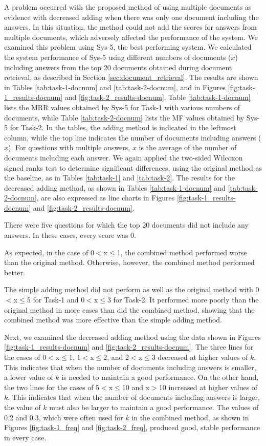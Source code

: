 A problem occurred with the proposed method of using multiple documents as evidence with decreased adding 
when there was only one document including the answers. 
In this situation, 
the method could not add the scores for answers from multiple documents, 
which adversely affected
the performance of the system. 
We examined this problem using Sys-5, the best performing system. 
We calculated the system performance of Sys-5 
using different numbers of documents ($x$) including answers from 
the top 20 documents obtained during document retrieval, as described in Section \ref{sec:document_retrieval}. 
The results are shown in Tables \ref{tab:task-1-docnum} and \ref{tab:task-2-docnum}, and 
in Figures \ref{fig:task-1_results-docnum} and \ref{fig:task-2_results-docnum}. 
Table \ref{tab:task-1-docnum} lists the MRR values obtained by Sys-5 for Task-1 with various numbers of documents, while
Table \ref{tab:task-2-docnum} lists the MF values obtained by Sys-5 for Task-2. 
In the tables, the adding method is indicated in the leftmost column, while
the top line indicates the number of documents including answers ($x$). 
For questions with multiple answers, 
$x$ is the average of the number of documents including each answer.
We again applied the two-sided Wilcoxon signed ranks test to determine significant differences, 
using the original method as the baseline, as in Tables \ref{tab:task-1} and \ref{tab:task-2}. 
The results for the decreased adding method, as shown in Tables \ref{tab:task-1-docnum} and \ref{tab:task-2-docnum}, are also expressed 
as line charts in Figures \ref{fig:task-1_results-docnum} and \ref{fig:task-2_results-docnum}. 

There were five questions for which
the top 20 documents did not include any answers. 
In these cases, every score was 0. 

As expected, in the case of 0$<$x$\leq$1, 
the combined method performed worse than 
the original method.
Otherwise, however, the combined method 
performed better. 

The simple adding method did not perform as well as 
the original method 
with 0$<$x$\leq$5 for Task-1 and 0$<$x$\leq$3 for Task-2. 
It performed more poorly than the original method 
in more cases than did the combined method, 
showing that 
the combined method was more effective than the simple adding method.

Next, we examined the decreased adding method 
using the data shown in Figures \ref{fig:task-1_results-docnum} and \ref{fig:task-2_results-docnum}. 
The three lines for the cases of 0$<$x$\leq$1, 1$<$x$\leq$2, and 2$<$x$\leq$3 
decreased at higher values of $k$. 
This indicates that when the number of documents including answers is smaller, 
a lower value of $k$ is needed to maintain a good performance. 
On the other hand, the two lines for the cases of 5$<$x$\leq$10 and x$>$10 increased at higher values of $k$. 
This indicates that when the number of documents including answers is larger, 
the value of $k$ must also be larger to maintain a good performance. 
The values of 0.2 and 0.3, which were often used for $k$ in the combined method, 
as shown in Figures \ref{fig:task-1_freq} and \ref{fig:task-2_freq}, 
produced good, stable performance in every case. 

